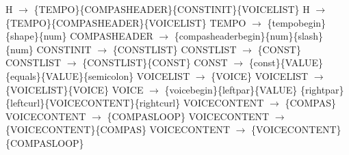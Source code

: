 H $\rightarrow$ \{TEMPO\}\{COMPASHEADER\}\{CONSTINIT\}\{VOICELIST\}\newline
H $\rightarrow$ \{TEMPO\}\{COMPASHEADER\}\{VOICELIST\}\newline
TEMPO $\rightarrow$ \{tempobegin\}\{shape\}\{num\}\newline
COMPASHEADER $\rightarrow$ \{compasheaderbegin\}\{num\}\{slash\}\{num\}\newline
CONSTINIT $\rightarrow$ \{CONSTLIST\}\newline
CONSTLIST $\rightarrow$ \{CONST\}\newline
CONSTLIST $\rightarrow$ \{CONSTLIST\}\{CONST\}\newline
CONST $\rightarrow$ \{const\}\{VALUE\}\{equals\}\{VALUE\}\{semicolon\}\newline
VOICELIST $\rightarrow$ \{VOICE\}\newline
VOICELIST $\rightarrow$ \{VOICELIST\}\{VOICE\}\newline
VOICE $\rightarrow$ \{voicebegin\}\{leftpar\}\{VALUE\} \{rightpar\}\{leftcurl\}\{VOICECONTENT\}\{rightcurl\}\newline
VOICECONTENT $\rightarrow$ \{COMPAS\}\newline
VOICECONTENT $\rightarrow$ \{COMPASLOOP\}\newline
VOICECONTENT $\rightarrow$ \{VOICECONTENT\}\{COMPAS\}\newline
VOICECONTENT $\rightarrow$ \{VOICECONTENT\}\{COMPASLOOP\}\newline
